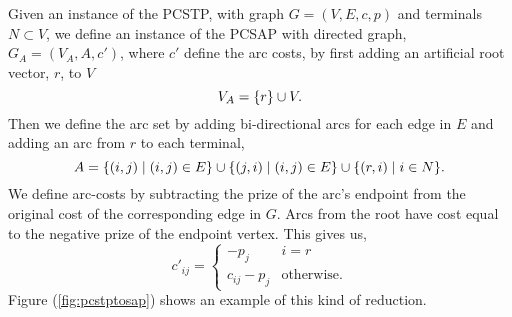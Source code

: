  Given an instance of the PCSTP, with graph $G = (V, E, c, p)$ and terminals $N \subset V$,
 we define an instance
 of the PCSAP with directed graph, $G_A = (V_A, A, c')$, where $c'$ define the arc costs,
 by first adding an
 artificial root vector, $r$, to $V$
 $$V_A = \{r\} \cup V\mathnormal{.}$$
 Then we define the arc set by adding bi-directional arcs for each edge in $E$ and
 adding an arc from $r$ to each terminal,
 $$A = \{(i,j) \mid (i,j) \in E \} \cup \{ (j,i) \mid (i,j) \in E \} \cup \{(r, i) \mid i \in N\}\mathnormal{.}$$
 We define arc-costs by subtracting the prize of the arc's endpoint from the original cost of the
 corresponding edge in $G$. Arcs from the root have cost equal to the negative prize of the endpoint vertex. This gives us,
 $$c'_{ij} =
 \begin{cases}
   -p_j & i = r \\
   c_{ij} - p_j & \text{otherwise.}
 \end{cases}
 $$
Figure (\ref{fig:pcstptosap}) shows an example of this kind of reduction.
